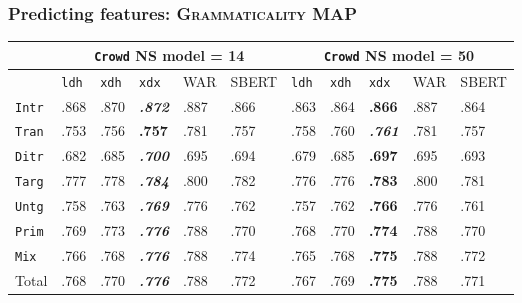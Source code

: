 \documentclass[xcolor={dvipsnames}]{beamer}
\newcommand{\feat}[1]{\textsc{#1}}
\newcommand{\param}[1]{\texttt{#1}}
\begin{document}


\begin{frame}
\frametitle{Predicting features: \feat{Grammaticality} MAP}

\small

\begin{table}[htb!]
\begin{center}
\setlength{\tabcolsep}{.35em}
\begin{tabular}{|l||l|l|l||l|l||l|l|l||l|l|}
\hline
 & \multicolumn{5}{c||}{\param{Crowd} NS model = 14} & \multicolumn{5}{c|}{\param{Crowd} NS model = 50} \\
\hline
    		& \param{ldh}	& \param{xdh} &	\param{xdx} & WAR	& {\scriptsize SBERT} & \param{ldh}	& \param{xdh} &	\param{xdx} & WAR	& {\scriptsize SBERT} \\ \hline
\hline
\param{Intr}  & .868 & .870 & \textit{\textbf{.872}} & .887 & .866 & .863 & .864 & \textbf{.866} & .887 & .864 \\ \hline
\param{Tran}  & .753 & .756 & \textbf{.757} & .781 & .757 & .758 & .760 & \textit{\textbf{.761}} & .781 & .757 \\ \hline
\param{Ditr}  & .682 & .685 & \textit{\textbf{.700}} & .695 & .694 & .679 & .685 & \textbf{.697} & .695 & .693 \\ \hline
\hline
\param{Targ}  & .777 & .778 & \textit{\textbf{.784}} & .800 & .782 & .776 & .776 & \textbf{.783} & .800 & .781 \\ \hline
\param{Untg}  & .758 & .763 & \textit{\textbf{.769}} & .776 & .762 & .757 & .762 & \textbf{.766} & .776 & .761 \\ \hline
\hline
\param{Prim}  & .769 & .773 & \textit{\textbf{.776}} & .788 & .770 & .768 & .770 & \textbf{.774} & .788 & .770 \\ \hline
\param{Mix}   & .766 & .768 & \textit{\textbf{.776}} & .788 & .774 & .765 & .768 & \textbf{.775} & .788 & .772 \\ \hline
\hline
Total & .768 & .770 & \textit{\textbf{.776}} & .788 & .772 & .767 & .769 & \textbf{.775} & .788 & .771 \\ \hline
\end{tabular}
\end{center}
\end{table}


\end{frame}
\end{document}
